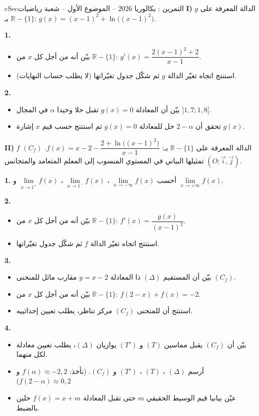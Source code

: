 \documentclass[12pt,a4paper]{article}
\newenvironment{BOX}[2]{\begin{otherlanguage}{english}\begin{arbox}{#1}{#2}}{\end{arbox}\end{otherlanguage}}
\newcounter{exo}
\newenvironment{tamrin}[1]{\stepcounter{exo}\begin{BOX}{cSec}{التمرين \theexo: #1}}{\end{BOX}}
\newcommand{\R}{\mathbb{R}}
\newenvironment{sq}{\begin{itemize}[leftmargin=2.4em,itemsep=3pt]}{\end{itemize}}
\newcommand{\qa}{\item[(أ)]}\newcommand{\qb}{\item[(ب)]}\newcommand{\qc}{\item[(جـ)]}\newcommand{\qd}{\item[(د)]}\newcommand{\qe}{\item[(هـ)]}
\newcommand{\QQ}[1]{\par\smallskip\textbf{#1.} }
\begin{document}
\begin{tamrin}{بكالوريا 2026 -- الموضوع الأول -- شعبة رياضيات}
\textbf{I)} $g$ الدالة المعرفة على $\R-\{1\}$ بـ: $g(x)=(x-1)^2+\ln\big((x-1)^2\big)$.
\QQ{1}
\begin{sq}
\qa بيّن أنه من أجل كل $x$ من $\R-\{1\}$: $g'(x)=\dfrac{2(x-1)^2+2}{x-1}$.
\qb استنتج اتجاه تغيّر الدالة $g$ ثم شكّل جدول تغيّراتها (لا يطلب حساب النهايات).
\end{sq}
\QQ{2}
\begin{sq}
\qa بيّن أن المعادلة $g(x)=0$ تقبل حلا وحيدا $\alpha$ في المجال $]1{,}7;1{,}8[$.
\qb تحقق أن $2-\alpha$ حل للمعادلة $g(x)=0$ ثم استنتج حسب قيم $x$ إشارة $g(x)$.
\end{sq}

\textbf{II)} $f$ الدالة المعرفة على $\R-\{1\}$ بـ: $f(x)=x-2-\dfrac{2+\ln\big((x-1)^2\big)}{x-1}$.
$(C_f)$ تمثيلها البياني في المستوي المنسوب إلى المعلم المتعامد والمتجانس $(O;\vec i,\vec j)$.
\QQ{1} أحسب $\lim\limits_{x\to -\infty}f(x)$ ، $\lim\limits_{x\to 1^{-}}f(x)$ ، $\lim\limits_{x\to 1^{+}}f(x)$ و $\lim\limits_{x\to +\infty}f(x)$.
\QQ{2}
\begin{sq}
\qa بيّن أنه من أجل كل $x$ من $\R-\{1\}$: $f'(x)=\dfrac{g(x)}{(x-1)^2}$.
\qb استنتج اتجاه تغيّر الدالة $f$ ثم شكّل جدول تغيّراتها.
\end{sq}
\QQ{3}
\begin{sq}
\qa بيّن أن المستقيم $(\Delta)$ ذا المعادلة $y=x-2$ مقارب مائل للمنحنى $(C_f)$.
\qb بيّن أنه من أجل كل $x$ من $\R-\{1\}$: $f(2-x)+f(x)=-2$.
\qc استنتج أن للمنحنى $(C_f)$ مركز تناظر، يطلب تعيين إحداثييه.
\end{sq}
\QQ{4}
\begin{sq}
\qa بيّن أن $(C_f)$ يقبل مماسين $(T)$ و $(T')$ يوازيان $(\Delta)$، يطلب تعيين معادلة لكل منهما.
\qb أرسم $(\Delta)$ ، $(T)$ ، $(T')$ و $(C_f)$. (نأخذ: $f(\alpha)\approx -2{,}2$ و $f(2-\alpha)\approx 0{,}2$)
\qc عيّن بيانيا قيم الوسيط الحقيقي $m$ حتى تقبل المعادلة $f(x)=x+m$ حلين بالضبط.
\end{sq}
\end{tamrin}
\end{document}

